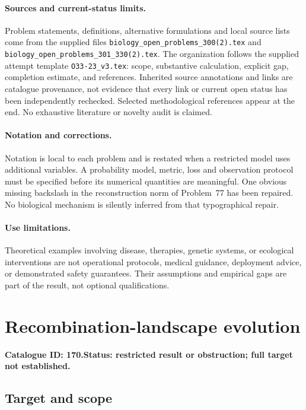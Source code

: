 \documentclass[11pt]{article}
\begin{document}
\paragraph{Sources and current-status limits.}
Problem statements, definitions, alternative formulations and local source lists
come from the supplied files
\texttt{biology\_open\_problems\_300(2).tex} and
\texttt{biology\_open\_problems\_301\_330(2).tex}.
The organization follows the supplied attempt template
\texttt{O33-23\_v3.tex}: scope, substantive calculation, explicit gap,
completion estimate, and references. Inherited source annotations and links are
catalogue provenance, not evidence that every link or current open status has
been independently rechecked. Selected methodological references appear at the
end. No exhaustive literature or novelty audit is claimed.

\paragraph{Notation and corrections.}
Notation is local to each problem and is restated when a restricted model uses
additional variables. A probability model, metric, loss and observation protocol
must be specified before its numerical quantities are meaningful. One obvious
missing backslash in the reconstruction norm of Problem~77 has been repaired.
No biological mechanism is silently inferred from that typographical repair.

\paragraph{Use limitations.}
Theoretical examples involving disease, therapies, genetic systems, or ecological
interventions are not operational protocols, medical guidance, deployment advice,
or demonstrated safety guarantees. Their assumptions and empirical gaps are part
of the result, not optional qualifications.

\setcounter{section}{169}
\section{Recombination-landscape evolution}
\label{prob:170}
\noindent\textbf{Catalogue ID: 170.}\quad \textbf{Status: restricted result or obstruction; full target not established.}
\subsection{Target and scope}
\end{document}
